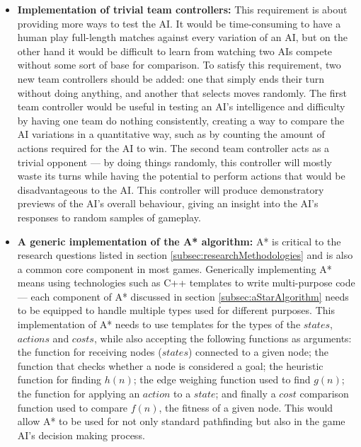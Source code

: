 \documentclass[11pt, a4paper]{report}
\begin{document}
\begin{itemize}
\item \textbf{Implementation of trivial team controllers:}
This requirement is about providing more ways to test the AI. It would be time-consuming to have a human play full-length matches against every variation of an AI, but on the other hand it would be difficult to learn from watching two AIs compete without some sort of base for comparison. To satisfy this requirement, two new team controllers should be added: one that simply ends their turn without doing anything, and another that selects moves randomly. The first team controller would be useful in testing an AI's intelligence and difficulty by having one team do nothing consistently, creating a way to compare the AI variations in a quantitative way, such as by counting the amount of actions required for the AI to win. The second team controller acts as a trivial opponent --- by doing things randomly, this controller will mostly waste its turns while having the potential to perform actions that would be disadvantageous to the AI. This controller will produce demonstratory previews of the AI's overall behaviour, giving an insight into the AI's responses to random samples of gameplay.

\item \textbf{A generic implementation of the A* algorithm:}
A* is critical to the research questions listed in section \ref{subsec:researchMethodologies} and is also a common core component in most games. Generically implementing A* means using technologies such as C++ templates to write multi-purpose code --- each component of A* discussed in section \ref{subsec:aStarAlgorithm} needs to be equipped to handle multiple types used for different purposes. This implementation of A* needs to use templates for the types of the $states$, $actions$ and $costs$, while also accepting the following functions as arguments: the function for receiving nodes ($states$) connected to a given node; the function that checks whether a node is considered a goal; the heuristic function for finding $h(n)$; the edge weighing function used to find $g(n)$; the function for applying an $action$ to a $state$; and finally a $cost$ comparison function used to compare $f(n)$, the fitness of a given node. This would allow A* to be used for not only standard pathfinding but also in the game AI's decision making process.


\end{itemize}
\end{document}
